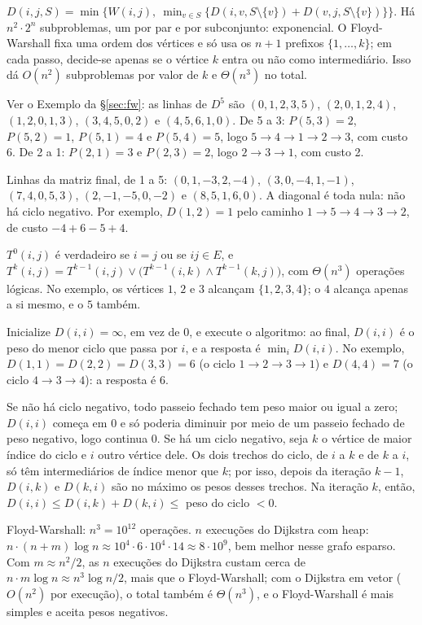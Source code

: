  $D(i,j,S)=\min\big\{W(i,j),\ \min_{v\in S}\{D(i,v,S\setminus\{v\})+D(v,j,S\setminus\{v\})\}\big\}$. Há $n^2\cdot2^n$ subproblemas, um por par e por subconjunto: exponencial. O Floyd-Warshall fixa uma ordem dos vértices e só usa os $n+1$ prefixos $\{1,\dots,k\}$; em cada passo, decide-se apenas se o vértice $k$ entra ou não como intermediário. Isso dá $O(n^2)$ subproblemas por valor de $k$ e $\Theta(n^3)$ no total.

 Ver o Exemplo da §\ref{sec:fw}: as linhas de $D^5$ são $(0,1,2,3,5)$, $(2,0,1,2,4)$, $(1,2,0,1,3)$, $(3,4,5,0,2)$ e $(4,5,6,1,0)$. De 5 a 3: $P(5,3)=2$, $P(5,2)=1$, $P(5,1)=4$ e $P(5,4)=5$, logo $5\to4\to1\to2\to3$, com custo 6. De 2 a 1: $P(2,1)=3$ e $P(2,3)=2$, logo $2\to3\to1$, com custo 2.

 Linhas da matriz final, de 1 a 5: $(0,1,-3,2,-4)$, $(3,0,-4,1,-1)$, $(7,4,0,5,3)$, $(2,-1,-5,0,-2)$ e $(8,5,1,6,0)$. A diagonal é toda nula: não há ciclo negativo. Por exemplo, $D(1,2)=1$ pelo caminho $1\to5\to4\to3\to2$, de custo $-4+6-5+4$.

 $T^0(i,j)$ é verdadeiro se $i=j$ ou se $ij\in E$, e $T^k(i,j)=T^{k-1}(i,j)\lor\big(T^{k-1}(i,k)\land T^{k-1}(k,j)\big)$, com $\Theta(n^3)$ operações lógicas. No exemplo, os vértices $1$, $2$ e $3$ alcançam $\{1,2,3,4\}$; o $4$ alcança apenas a si mesmo, e o $5$ também.

 Inicialize $D(i,i)=\infty$, em vez de 0, e execute o algoritmo: ao final, $D(i,i)$ é o peso do menor ciclo que passa por $i$, e a resposta é $\min_iD(i,i)$. No exemplo, $D(1,1)=D(2,2)=D(3,3)=6$ (o ciclo $1\to2\to3\to1$) e $D(4,4)=7$ (o ciclo $4\to3\to4$): a resposta é 6.

 Se não há ciclo negativo, todo passeio fechado tem peso maior ou igual a zero; $D(i,i)$ começa em 0 e só poderia diminuir por meio de um passeio fechado de peso negativo, logo continua 0. Se há um ciclo negativo, seja $k$ o vértice de maior índice do ciclo e $i$ outro vértice dele. Os dois trechos do ciclo, de $i$ a $k$ e de $k$ a $i$, só têm intermediários de índice menor que $k$; por isso, depois da iteração $k-1$, $D(i,k)$ e $D(k,i)$ são no máximo os pesos desses trechos. Na iteração $k$, então, $D(i,i)\le D(i,k)+D(k,i)\le$ peso do ciclo $<0$.

 Floyd-Warshall: $n^3=10^{12}$ operações. $n$ execuções do Dijkstra com heap: $n\cdot(n+m)\log n\approx10^4\cdot6\cdot10^4\cdot14\approx8\cdot10^9$, bem melhor nesse grafo esparso. Com $m\approx n^2/2$, as $n$ execuções do Dijkstra custam cerca de $n\cdot m\log n\approx n^3\log n/2$, mais que o Floyd-Warshall; com o Dijkstra em vetor ($O(n^2)$ por execução), o total também é $\Theta(n^3)$, e o Floyd-Warshall é mais simples e aceita pesos negativos.

